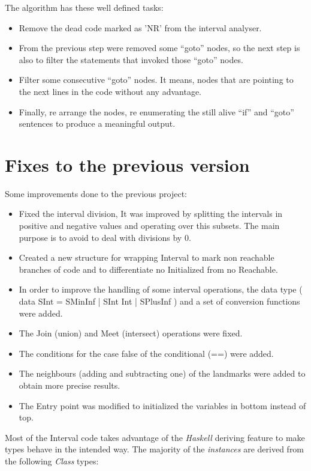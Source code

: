 \documentclass{article}
\begin{document}
The algorithm has these well defined tasks:

\begin{itemize}
  \item Remove the dead code marked as 'NR'  from the interval analyser. 
  \item From the previous step were removed some ``goto'' nodes, so the next step is also to filter the statements that invoked those ``goto'' nodes.
  \item Filter some consecutive ``goto'' nodes. It means, nodes that are pointing to the next lines in the code without any advantage.
  \item Finally, re arrange the nodes, re enumerating the still alive ``if'' and ``goto'' sentences to produce a meaningful output.
\end{itemize}


\section{Fixes to the previous version}
Some improvements done to the previous project:

\begin{itemize}
  \item  Fixed the interval division, It was improved by splitting the intervals in positive and negative values and operating over this subsets. The main purpose is to avoid to deal with divisions by 0.
  \item  Created a new structure for wrapping Interval to mark non reachable branches of code and to differentiate no Initialized from no Reachable.
  \item  In order to improve the handling of some interval operations, the data type ( data SInt = SMinInf | SInt Int | SPlusInf ) and a set of conversion functions were added.
  \item  The Join (union) and Meet (intersect) operations were fixed.
  \item  The conditions for the case false of the conditional (==) were added.
  \item  The neighbours (adding and subtracting one) of the landmarks were added to obtain more precise results.
  \item  The Entry point was modified to initialized the variables in bottom instead of top.
\end{itemize}

Most of the Interval code takes advantage of the \emph{Haskell} deriving feature to make types behave in the intended way. The majority of the \emph{instances} are derived from the following \emph{Class} types:
\end{document}
